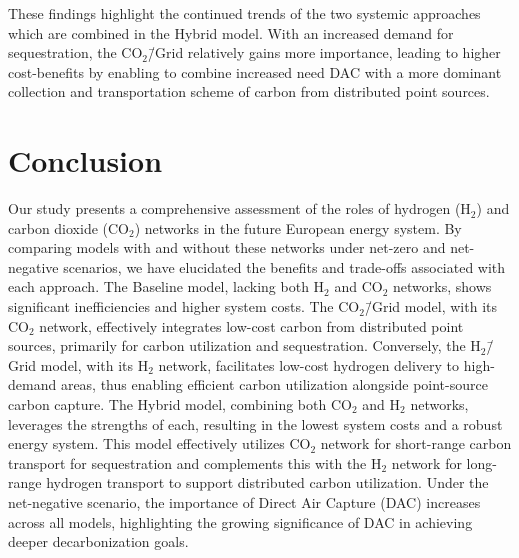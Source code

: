 \documentclass[twocolumn]{article}
\newcommand{\COtwo}{CO$_2$}
\newcommand{\Htwo}{H$_2$}
\newcommand{\COgrid}{CO$_2$\=/Grid}
\newcommand{\Hgrid}{H$_2$\=/Grid}
\newcommand{\carbongrid}{CO$_2$\=/Grid}
\newcommand{\hybridmodel}{Hybrid model}
\begin{document}
These findings highlight the continued trends of the two systemic approaches which are combined in the \hybridmodel. With an increased demand for sequestration, the \carbongrid{} relatively gains more importance, leading to higher cost-benefits by enabling to combine increased need DAC with a more dominant collection and transportation scheme of carbon from distributed point sources.



\section{Conclusion}
\label{sec:conclusion}


Our study presents a comprehensive assessment of the roles of hydrogen (\Htwo{}) and carbon dioxide (\COtwo{}) networks in the future European energy system. By comparing models with and without these networks under net-zero and net-negative scenarios, we have elucidated the benefits and trade-offs associated with each approach. The Baseline model, lacking both \Htwo{} and \COtwo{} networks, shows significant inefficiencies and higher system costs. The \COgrid{} model, with its \COtwo{} network, effectively integrates low-cost carbon from distributed point sources, primarily for carbon utilization and sequestration. Conversely, the \Hgrid{} model, with its \Htwo{} network, facilitates low-cost hydrogen delivery to high-demand areas, thus enabling efficient carbon utilization alongside point-source carbon capture.
The Hybrid model, combining both \COtwo{} and \Htwo{} networks, leverages the strengths of each, resulting in the lowest system costs and a robust energy system. This model effectively utilizes \COtwo{} network for short-range carbon transport for sequestration and complements this with the \Htwo{} network for long-range hydrogen transport to support distributed carbon utilization. Under the net-negative scenario, the importance of Direct Air Capture (DAC) increases across all models, highlighting the growing significance of DAC in achieving deeper decarbonization goals.
\end{document}
